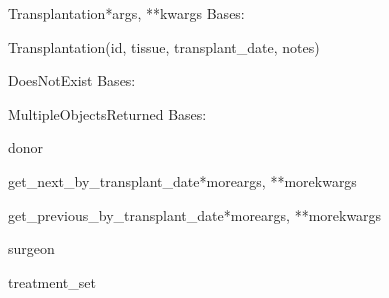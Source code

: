 \documentclass[letterpaper,10pt,english]{sphinxmanual}
\begin{document}
\hypertarget{data.models.Transplantation}{}\begin{classdesc}{Transplantation}{*args, **kwargs}
Bases: 

Transplantation(id, tissue, transplant\_date, notes)

\hypertarget{data.models.Transplantation.DoesNotExist}{}\begin{excdesc}{DoesNotExist}
Bases: 
\end{excdesc}

\hypertarget{data.models.Transplantation.MultipleObjectsReturned}{}\begin{excdesc}{MultipleObjectsReturned}
Bases: 
\end{excdesc}

\hypertarget{data.models.Transplantation.donor}{}\begin{memberdesc}[Transplantation]{donor}\end{memberdesc}

\hypertarget{data.models.Transplantation.get\_next\_by\_transplant\_date}{}\begin{methoddesc}[Transplantation]{get\_next\_by\_transplant\_date}{*moreargs, **morekwargs}\end{methoddesc}

\hypertarget{data.models.Transplantation.get\_previous\_by\_transplant\_date}{}\begin{methoddesc}[Transplantation]{get\_previous\_by\_transplant\_date}{*moreargs, **morekwargs}\end{methoddesc}

\hypertarget{data.models.Transplantation.surgeon}{}\begin{memberdesc}[Transplantation]{surgeon}\end{memberdesc}

\hypertarget{data.models.Transplantation.treatment\_set}{}\begin{memberdesc}[Transplantation]{treatment\_set}\end{memberdesc}
\end{classdesc}
\end{document}

